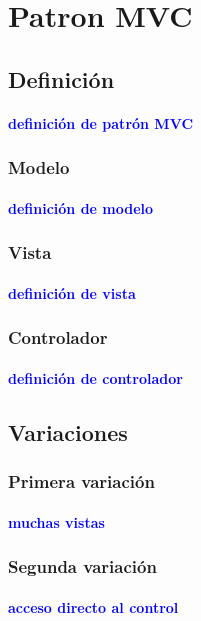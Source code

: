 \section{Patron MVC}\label{sec-mvc}
\subsection{Definición}
\paragraph*{\textcolor{blue}{definición de patrón MVC}}
\subsubsection{Modelo}
\paragraph*{\textcolor{blue}{definición de modelo}}
\subsubsection{Vista}
\paragraph*{\textcolor{blue}{definición de vista}}
\subsubsection{Controlador}
\paragraph*{\textcolor{blue}{definición de controlador}}
\subsection{Variaciones}
\subsubsection{Primera variación}
\paragraph*{\textcolor{blue}{muchas vistas}}
\subsubsection{Segunda variación}
\paragraph*{\textcolor{blue}{acceso directo al control}}

